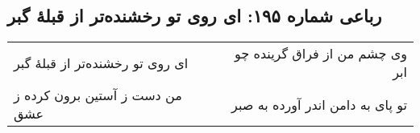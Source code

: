 \begin{center}
\section*{رباعی شماره ۱۹۵: ای روی تو رخشنده‌تر از قبلهٔ گبر}
\label{sec:sh195}
\begin{longtable}{l p{0.5cm} r}
ای روی تو رخشنده‌تر از قبلهٔ گبر
&&
وی چشم من از فراق گرینده چو ابر
\\
من دست ز آستین برون کرده ز عشق
&&
تو پای به دامن اندر آورده به صبر
\\
\end{longtable}
\end{center}
